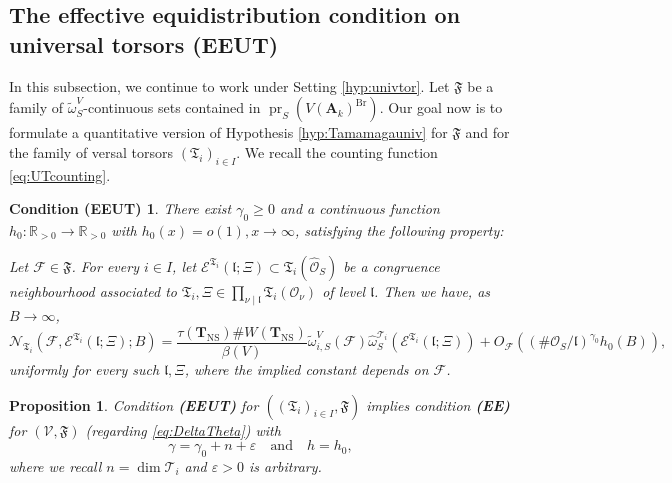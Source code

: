 \documentclass[11pt,letterpaper]{amsart}
\newcommand{\BR}{{\mathbb {R}}}
\newcommand{\CE}{{\mathcal {E}}}
\newcommand{\CF}{{\mathcal {F}}}
\newcommand{\CN}{{\mathcal {N}}}
\newcommand{\CO}{{\mathcal {O}}}
\newcommand{\CV}{{\mathcal {V}}}
\newcommand{\RA}{{\mathbf {A}}}
\newcommand{\CTUT}{\mathcal{T}}
\newcommand{\FTUT}{\mathfrak{T}}
\newcommand{\CTNS}{\mathbf{T}_{\operatorname{NS}}}
\theoremstyle{plain}
\numberwithin{equation}{section}
\newtheorem{proposition}[theorem]{Proposition}
\newtheorem*{condEEUT}{Condition (EEUT)}
\theoremstyle{definition}
\theoremstyle{remark}
\begin{document}
\subsection{The effective equidistribution condition on universal torsors (EEUT)}\label{se:EEUT}
In this subsection, we continue to work under Setting \ref{hyp:univtor}.
Let $\mathfrak{F}$ be a family of $\widetilde{\omega}_S^V$-continuous sets contained in $\operatorname{pr}_S(V(\RA_k)^{\operatorname{Br}})$. 
Our goal now is to formulate a quantitative version of Hypothesis \ref{hyp:Tamamagauniv} for $\mathfrak{F}$ and for the family of versal torsors $(\FTUT_i)_{i\in I}$. We recall the counting function \eqref{eq:UTcounting}.
\begin{condEEUT}
There exist $\gamma_0\geqslant 0$ and a continuous function $h_0:\BR_{>0}\to\BR_{>0}$ with $h_0(x)=o(1),x\to\infty$, satisfying the following property:

		Let
		$\CF\in\mathfrak{F}$. For every $i\in I$, let $\CE^{\FTUT_i}(\mathfrak{l};\Xi)\subset \FTUT_i(\widehat{\CO}_S)$ be a congruence neighbourhood associated to  $\FTUT_i,\Xi\in\prod_{\nu\mid\mathfrak{l}}\FTUT_i(\CO_\nu)$ of level $\mathfrak{l}$. Then we have, as $B\to\infty$,
		\begin{equation*}
			\CN_{\FTUT_i}(\CF,\CE^{\FTUT_i}(\mathfrak{l};\Xi);B)=
			 \frac{\tau(\CTNS)\# W(\CTNS)}{\beta(V)}\widetilde{\omega}_{i,S}^V(\CF)\widehat{\omega}_S^{\CTUT_i}(\CE^{\FTUT_i}(\mathfrak{l};\Xi))+O_{\CF}((\#\CO_S/\mathfrak{l})^{\gamma_0} h_0(B)),	
		\end{equation*}
		uniformly for every such $\mathfrak{l},\Xi$, where the implied constant depends on $\CF$.
\end{condEEUT}
\begin{proposition}\label{prop:univtorEEGS}
Condition \textbf{(EEUT)} for $((\FTUT_i)_{i\in I},\mathfrak{F})$  implies condition \textbf{(EE)} for $(\CV,\mathfrak{F})$ (regarding \eqref{eq:DeltaTheta})
 with $$\gamma=\gamma_0+n+\varepsilon\quad\text{and}\quad h=h_0,$$
where we recall $n=\dim \CTUT_i$ and $\varepsilon>0$ is arbitrary. 
\end{proposition}
\end{document}
